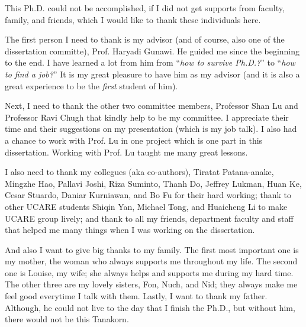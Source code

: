 This Ph.D. could not be accomplished, if I did not get supports from faculty,
family, and friends, which I would like to thank these individuals here.

The first person I need to thank is my advisor (and of course, also one of the
dissertation committe), Prof. Haryadi Gunawi. He guided me since the beginning
to the end. I have learned a lot from him from ``\textit{how to survive
Ph.D.?}'' to ``\textit{how to find a job?}'' It is my great pleasure to have him
as my advisor (and it is also a great experience to be the \textit{first}
student of him).

Next, I need to thank the other two committee members, Professor Shan Lu and
Professor Ravi Chugh that kindly help to be my committee. I appreciate their
time and their suggestions on my presentation (which is my job talk). I also had
a chance to work with Prof. Lu in one project which is one part in this
dissertation.  Working with Prof. Lu taught me many great lessons.

I also need to thank my collegues (aka co-authors), Tiratat Patana-anake,
Mingzhe Hao, Pallavi Joshi, Riza Suminto, Thanh Do, Jeffrey Lukman, Huan Ke,
Cesar Stuardo, Daniar Kurniawan, and Bo Fu for their hard working; thank to
other UCARE students Shiqin Yan, Michael Tong, and Huaicheng Li to make UCARE
group lively; and thank to all my friends, department faculty and staff that
helped me many things when I was working on the dissertation.

And also I want to give big thanks to my family. The first most important one is
my mother, the woman who always supports me throughout my life. The second one
is Louise, my wife; she always helps and supports me during my hard time. The
other three are my lovely sisters, Fon, Nuch, and Nid; they always make me feel
good everytime I talk with them. Lastly, I want to thank my father. Although,
he could not live to the day that I finish the Ph.D., but without him, there
would not be this Tanakorn.

